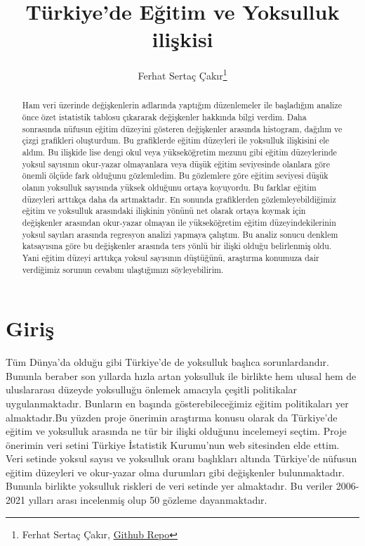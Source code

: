 \documentclass[
  12pt,
]{article}
\title{Türkiye'de Eğitim ve Yoksulluk ilişkisi}
\author{Ferhat Sertaç Çakır\footnote{Ferhat Sertaç Çakır, \href{https://github.com/fsccakir/Ferhat-Cakir.git}{Github Repo}}}
\date{}
\begin{document}
\maketitle
\begin{abstract}
Ham veri üzerinde değişkenlerin adlarında yaptığım düzenlemeler ile başladığım analize önce özet istatistik tablosu çıkararak değişkenler hakkında bilgi verdim. Daha sonrasında nüfusun eğitim düzeyini gösteren değişkenler arasında histogram, dağılım ve çizgi grafikleri oluşturdum. Bu grafiklerde eğitim düzeyleri ile yoksulluk ilişkisini ele aldım. Bu ilişkide lise dengi okul veya yükseköğretim mezunu gibi eğitim düzeylerinde yoksul sayısının okur-yazar olmayanlara veya düşük eğitim seviyesinde olanlara göre önemli ölçüde fark olduğunu gözlemledim. Bu gözlemlere göre eğitim seviyesi düşük olanın yoksulluk sayısında yüksek olduğunu ortaya koyuyordu. Bu farklar eğitim düzeyleri arttıkça daha da artmaktadır. En sonunda grafiklerden gözlemleyebildiğimiz eğitim ve yoksulluk arasındaki ilişkinin yönünü net olarak ortaya koymak için değişkenler arasından okur-yazar olmayan ile yükseköğretim eğitim düzeyindekilerinin yoksul sayıları arasında regresyon analizi yapmaya çalıştım. Bu analiz sonucu denklem katsayısına göre bu değişkenler arasında ters yönlü bir ilişki olduğu belirlenmiş oldu. Yani eğitim düzeyi arttıkça yoksul sayısının düştüğünü, araştırma konumuza dair verdiğimiz sorunun cevabını ulaştığımızı söyleyebilirim.
\end{abstract}

\hypertarget{giriux15f}{%
\section{Giriş}\label{giriux15f}}

Tüm Dünya'da olduğu gibi Türkiye'de de yoksulluk başlıca sorunlardandır. Bununla beraber son yıllarda hızla artan yoksulluk ile birlikte hem ulusal hem de uluslararası düzeyde yoksulluğu önlemek amacıyla çeşitli politikalar uygulanmaktadır. Bunların en başında gösterebileceğimiz eğitim politikaları yer almaktadır.Bu yüzden proje önerimin araştırma konusu olarak da Türkiye'de eğitim ve yoksulluk arasında ne tür bir ilişki olduğunu incelemeyi seçtim. Proje önerimin veri setini Türkiye İstatistik Kurumu'nun web sitesinden elde ettim. Veri setinde yoksul sayısı ve yoksulluk oranı başlıkları altında Türkiye'de nüfusun eğitim düzeyleri ve okur-yazar olma durumları gibi değişkenler bulunmaktadır. Bununla birlikte yoksulluk riskleri de veri setinde yer almaktadır. Bu veriler 2006-2021 yılları arası incelenmiş olup 50 gözleme dayanmaktadır.
\end{document}
